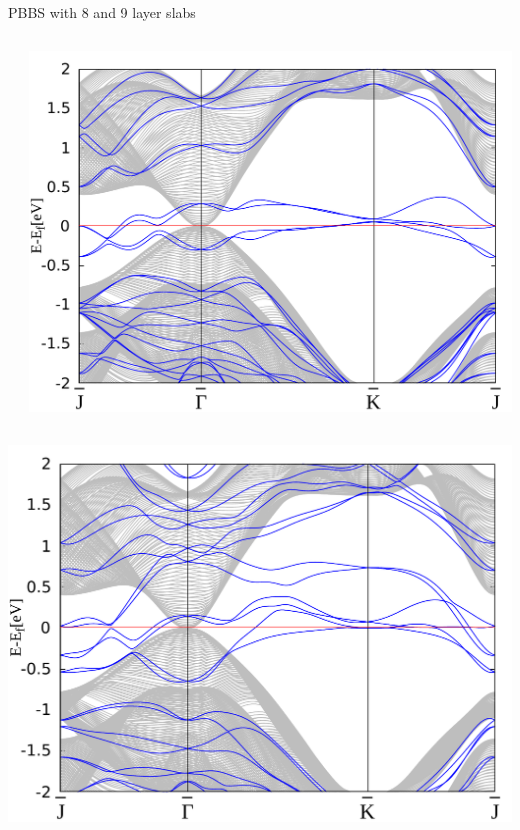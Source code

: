 \begin{frame}{PBBS with 8 and 9 layer slabs}
\begin{columns}
\begin{column}{.34\linewidth}
		\end{column}
		\begin{column}{.34\linewidth}
			\centering
			\includegraphics[width=\linewidth]{Hg_termination/no_H_bulk+9_layers_no_dos_-2_2.pdf}
		\end{column}
	\end{columns}
	\begin{columns}
		\begin{column}{.34\linewidth}
			\centering
			\includegraphics[width=\linewidth]{Te_and_Hg_termination/bulk+8_layers_no_dos_-2_2.pdf}

\end{column}
\end{columns}
\end{frame}
